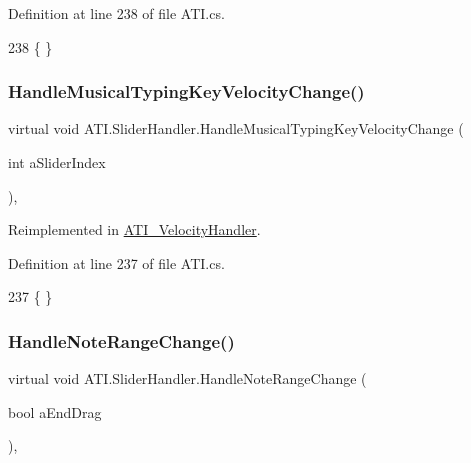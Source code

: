 Definition at line 238 of file A\+T\+I.\+cs.


\begin{DoxyCode}
238 \{ \}
\end{DoxyCode}
\mbox{\label{class_a_t_i_1_1_slider_handler_ac82219a0a69f17025d9484f9e45cca80}} 
\subsubsection{\texorpdfstring{Handle\+Musical\+Typing\+Key\+Velocity\+Change()}{HandleMusicalTypingKeyVelocityChange()}}
{\footnotesize\ttfamily virtual void A\+T\+I.\+Slider\+Handler.\+Handle\+Musical\+Typing\+Key\+Velocity\+Change (\begin{DoxyParamCaption}\item[{int}]{a\+Slider\+Index }\end{DoxyParamCaption})\hspace{0.3cm}{\ttfamily [protected]}, {\ttfamily [virtual]}}



Reimplemented in \hyperlink{class_a_t_i___velocity_handler_a5b00635239f4f10aaefc5898a8f1b975}{A\+T\+I\+\_\+\+Velocity\+Handler}.



Definition at line 237 of file A\+T\+I.\+cs.


\begin{DoxyCode}
237 \{ \}
\end{DoxyCode}
\mbox{\label{class_a_t_i_1_1_slider_handler_a4d3915be92feddd4c45027a71c3a338c}} 
\subsubsection{\texorpdfstring{Handle\+Note\+Range\+Change()}{HandleNoteRangeChange()}}
{\footnotesize\ttfamily virtual void A\+T\+I.\+Slider\+Handler.\+Handle\+Note\+Range\+Change (\begin{DoxyParamCaption}\item[{bool}]{a\+End\+Drag }\end{DoxyParamCaption})\hspace{0.3cm}{\ttfamily [protected]}, {\ttfamily [virtual]}}




